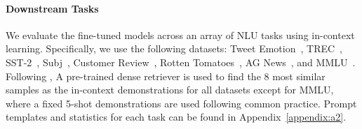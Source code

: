 \paragraph{Downstream Tasks} We evaluate the fine-tuned models across an array of NLU tasks using in-context learning. Specifically, we use the following datasets: Tweet Emotion~\citep{tweetemotion}, TREC~\citep{trec1,trec2}, SST-2~\citep{sst2}, Subj~\citep{subj}, Customer Review~\citep{cr}, Rotten Tomatoes~\citep{rt}, AG News~\citep{agnews}, and MMLU~\citep{mmlu}. Following \cite{sail,wu-etal-2023-openicl}, A pre-trained dense retriever is used to find the 8 most similar samples as the in-context demonstrations for all datasets except for MMLU, where a fixed 5-shot demonstrations are used following common practice. Prompt templates and statistics for each task can be found in 
 Appendix~\ref{appendix:a2}.
